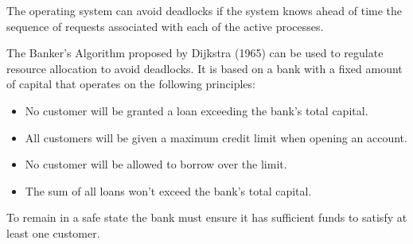 \documentclass[12pt letter]{report}
\begin{document}
The operating system can avoid deadlocks if the system knows ahead of
time the sequence of requests associated with each of the active processes.

The Banker's Algorithm proposed by Dijkstra (1965) can be used to
regulate resource allocation to avoid deadlocks. It is based on a
bank with a fixed amount  of capital that operates on the following principles:
\begin{itemize}
  \item No customer will be granted a loan exceeding the bank's total capital.
  \item All customers will be given a maximum credit limit when
    opening an account.
  \item No customer will be allowed to borrow over the limit.
  \item The sum of all loans won't exceed the bank's total capital.
\end{itemize}

To remain in a safe state the bank must ensure it has sufficient
funds to satisfy at least one customer.
\end{document}
